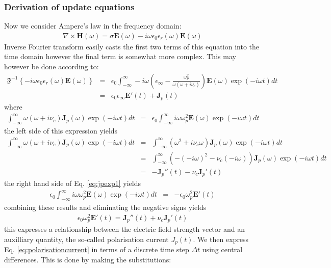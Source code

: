 \documentclass[a4paper, 12pt]{article}
\begin{document}
	\subsubsection{Derivation of update equations}
	Now we consider Ampere's law in the frequency domain:
	\begin{eqnarray}
		\nabla\times\boldsymbol{H}(\omega)=\sigma\boldsymbol{E}(\omega)-i\omega\epsilon_0\epsilon_r(\omega)\boldsymbol{E}(\omega)\label{eq:ampere}
	\end{eqnarray}
	Inverse Fourier transform easily casts the first two terms of this
	equation into the time domain however the final term is somewhat more
	complex. This may however be done according to:
	\begin{eqnarray}
		\mathfrak{F}^{-1}\left\{-i\omega\epsilon_0\epsilon_r(\omega)\boldsymbol{E}(\omega)\right\}&=&
		\epsilon_0\int_{-\infty}^{\infty}-i\omega\left(\epsilon_\infty -
		\frac{\omega_p^2}{\omega\left(\omega+i\nu_c\right)}\right)\boldsymbol{E}(\omega)\exp(-i\omega
		t)dt\\
		&=&\epsilon_0\epsilon_\infty\boldsymbol{E}'(t)+\boldsymbol{J}_p(t)
	\end{eqnarray}
	where 
	\begin{eqnarray}
		\int_{-\infty}^{\infty}\omega\left(\omega+i\nu_c\right)\boldsymbol{J}_p(\omega)\exp(-i\omega t)dt&=&\epsilon_0\int_{-\infty}^{\infty}i\omega\omega_p^2\boldsymbol{E}(\omega)\exp(-i\omega
		t)dt\label{eq:jpexp1}
	\end{eqnarray}
	the left side of this expression yields
	\begin{eqnarray}
		\int_{-\infty}^{\infty}\omega\left(\omega+i\nu_c\right)\boldsymbol{J}_p(\omega)\exp(-i\omega
		t)dt&=&\int_{-\infty}^{\infty}\left(\omega^2+i\nu_c\omega\right)\boldsymbol{J}_p(\omega)\exp(-i\omega
		t)dt\\
		&=&\int_{-\infty}^{\infty}\left( -(-i\omega)^2 -\nu_c(-i\omega)\right)\boldsymbol{J}_p(\omega)\exp(-i\omega
		t)dt\\
		&=&-\boldsymbol{J}_p''(t) - \nu_c\boldsymbol{J}_p'(t)
	\end{eqnarray}
	the right hand side of Eq. \ref{eq:jpexp1} yields
	\begin{eqnarray}
		\epsilon_0\int_{-\infty}^{\infty}i\omega\omega_p^2\boldsymbol{E}(\omega)\exp(-i\omega
		t)dt&=&-\epsilon_0\omega_p^2\boldsymbol{E}'(t)
	\end{eqnarray}
	combining these results and eliminating the negative signs  yields
	\begin{eqnarray}
		\epsilon_0\omega_p^2\boldsymbol{E}'(t)=\boldsymbol{J}_p''(t) + \nu_c\boldsymbol{J}_p'(t)\label{eq:polarisationcurrent}
	\end{eqnarray}
	this expresses a relationship between the electric field strength
	vector and an auxilliary quantity, the so-called polarisation current
	${J}_p(t)$. We then express Eq. \ref{eq:polarisationcurrent} in terms
	of a discrete time step $\Delta t$ using central differences. This is
	done by making the substitutions:
	
\end{document}
